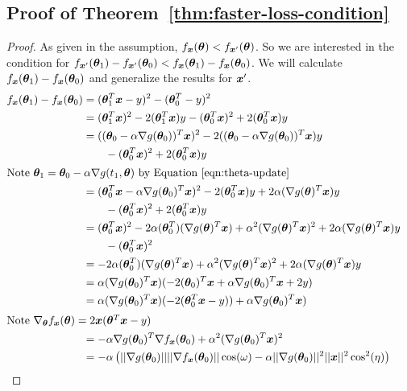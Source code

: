 \documentclass{article} %
\begin{document}
\begin{appendices}
  \subsection{Proof of Theorem~\ref{thm:faster-loss-condition}}
  	\label{app:faster-loss-condition}
	\begin{proof}
		As given in the assumption, $f_{{\bm{x}}}({\bm{\theta}}) < f_{{\bm{x}}'}({\bm{\theta}})$. So we are interested in the condition for $f_{{\bm{x}}'}({\bm{\theta}}_1) - f_{{\bm{x}}'}({\bm{\theta}}_0) < f_{{\bm{x}}}({\bm{\theta}}_1) - f_{{\bm{x}}}({\bm{\theta}}_0)$. We will calculate $f_{{\bm{x}}}({\bm{\theta}}_1) - f_{{\bm{x}}}({\bm{\theta}}_0)$ and generalize the results for ${\bm{x}}'$.
		\begingroup
		\addtolength{\jot}{1em}
		\begin{align}
			f_\vx(\vtheta_1) - f_\vx(\vtheta_0) &= (\vtheta_1^T\vx - y)^2 - (\vtheta_0^T - y)^2 &&\\
			&= (\vtheta_1^T\vx)^2 - 2(\vtheta_1^T\vx)y - (\vtheta^T_0\vx)^2 + 2(\vtheta_0^T\vx)y &&\\
			&= ((\vtheta_0 - \alpha \nabla g(\vtheta_0))^T\vx)^2 - 2((\vtheta_0 - \alpha\nabla g(\vtheta_0))^T\vx)y \notag\\ &\qquad - (\vtheta^T_0\vx)^2 + 2(\vtheta_0^T\vx)y &&\\
			\intertext{Note $\vtheta_1 = \vtheta_0 - \alpha\nabla g(t_1,\vtheta)$ by Equation \ref{eqn:theta-update}}
			&= (\vtheta_0^T\vx - \alpha\nabla g(\vtheta_0)^T \vx)^2 - 2(\vtheta_0^T\vx)y + 2\alpha(\nabla g(\vtheta)^T\vx)y \notag\\ &\qquad- (\vtheta^T_0\vx)^2 + 2(\vtheta_0^T\vx)y &&\\
			&= (\vtheta_0^T\vx)^2 - 2\alpha(\vtheta_0^T)(\nabla g(\vtheta)^T\vx) + \alpha^2(\nabla g(\vtheta)^T\vx)^2 + 2\alpha(\nabla g(\vtheta)^T\vx)y \notag\\ &\qquad- (\vtheta^T_0\vx)^2&& \\
			&= - 2\alpha(\vtheta_0^T)(\nabla g(\vtheta)^T\vx) + \alpha^2(\nabla g(\vtheta)^T\vx)^2 + 2\alpha(\nabla g(\vtheta)^T\vx)y &&\\
			&= \alpha(\nabla g(\vtheta_0)^T\vx) (-2(\vtheta_0)^T\vx + \alpha \nabla g(\vtheta_0)^T\vx + 2y) &&\\
			&= \alpha(\nabla g(\vtheta_0)^T\vx) (-2(\vtheta_0^T\vx -y)) + \alpha \nabla g(\vtheta_0)^T\vx) &&\\
			\intertext{Note $\nabla_{\vtheta}f_{\vx}(\vtheta) = 2\vx(\vtheta^T\vx - y)$}
			&= -\alpha\nabla g(\vtheta_0)^T\nabla f_\vx(\vtheta_0) + \alpha^2 (\nabla g(\vtheta_0)^T\vx)^2 &&\\
			&= -\alpha\left(|| \nabla g(\vtheta_0) || || \nabla f_\vx(\vtheta_0) || \cos(\omega)- \alpha || \nabla g(\vtheta_0) ||^2 || \vx || ^2 \cos^2(\eta) \right) &&\\

\end{align}
\end{proof}
\end{appendices}
\end{document}
